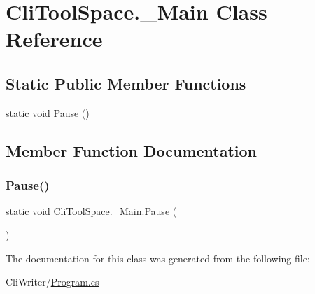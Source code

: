 \hypertarget{class_cli_tool_space_1_1___main}{}\section{Cli\+Tool\+Space.\+\_\+\+Main Class Reference}
\label{class_cli_tool_space_1_1___main}
\subsection*{Static Public Member Functions}
\begin{DoxyCompactItemize}
\item 
static void \mbox{\hyperlink{class_cli_tool_space_1_1___main_af4f1f95edf3ad38fcc5e083c6cef2078}{Pause}} ()
\end{DoxyCompactItemize}


\subsection{Member Function Documentation}
\mbox{\label{class_cli_tool_space_1_1___main_af4f1f95edf3ad38fcc5e083c6cef2078}} 
\subsubsection{\texorpdfstring{Pause()}{Pause()}}
{\footnotesize\ttfamily static void Cli\+Tool\+Space.\+\_\+\+Main.\+Pause (\begin{DoxyParamCaption}{ }\end{DoxyParamCaption})\hspace{0.3cm}{\ttfamily [static]}}



The documentation for this class was generated from the following file\+:\begin{DoxyCompactItemize}
\item 
Cli\+Writer/\mbox{\hyperlink{_program_8cs}{Program.\+cs}}\end{DoxyCompactItemize}
